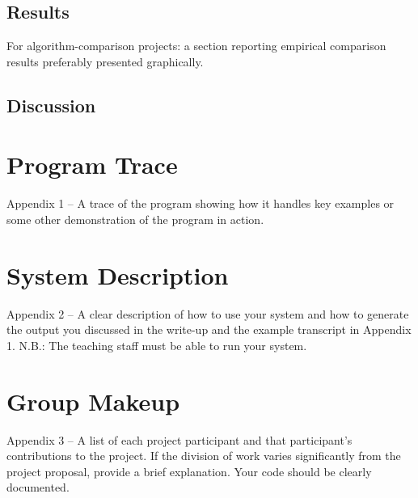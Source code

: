 \documentclass[11pt]{article}
\begin{document}
\subsection{Results}

 For algorithm-comparison projects: a section reporting empirical comparison results preferably presented graphically.


\subsection{Discussion}


\appendix

\section{Program Trace}

Appendix 1 – A trace of the program showing how it handles key examples or some other demonstration of the program in action.

\section{System Description}

 Appendix 2 – A clear description of how to use your system and how to generate the output you discussed in the write-up and the example transcript in Appendix 1. N.B.: The teaching staff must be able to run your system.

\section{Group Makeup}

 Appendix 3 – A list of each project participant and that
participant’s contributions to the project. If the division of work
varies significantly from the project proposal, provide a brief
explanation.  Your code should be clearly documented. 



 

\end{document}
